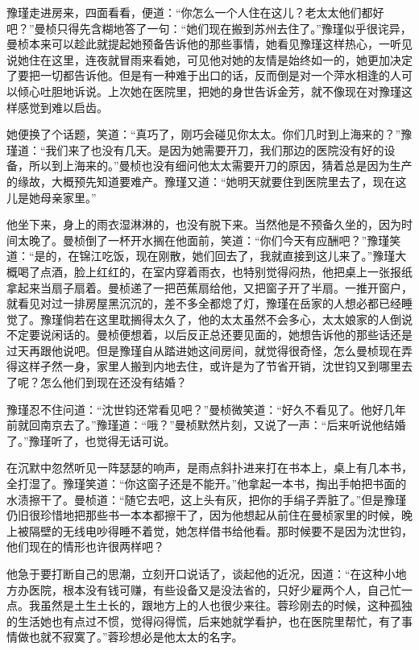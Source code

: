 \par 豫瑾走进房来，四面看看，便道：“你怎么一个人住在这儿？老太太他们都好吧？”曼桢只得先含糊地答了一句：“她们现在搬到苏州去住了。”豫瑾似乎很诧异，曼桢本来可以趁此就提起她预备告诉他的那些事情，她看见豫瑾这样热心，一听见说她住在这里，连夜就冒雨来看她，可见他对她的友情是始终如一的，她更加决定了要把一切都告诉他。但是有一种难于出口的话，反而倒是对一个萍水相逢的人可以倾心吐胆地诉说。上次她在医院里，把她的身世告诉金芳，就不像现在对豫瑾这样感觉到难以启齿。
\par 她便换了个话题，笑道：“真巧了，刚巧会碰见你太太。你们几时到上海来的？”豫瑾道：“我们来了也没有几天。是因为她需要开刀，我们那边的医院没有好的设备，所以到上海来的。”曼桢也没有细问他太太需要开刀的原因，猜着总是因为生产的缘故，大概预先知道要难产。豫瑾又道：“她明天就要住到医院里去了，现在这儿是她母亲家里。”
\par 他坐下来，身上的雨衣湿淋淋的，也没有脱下来。当然他是不预备久坐的，因为时间太晚了。曼桢倒了一杯开水搁在他面前，笑道：“你们今天有应酬吧？”豫瑾笑道：“是的，在锦江吃饭，现在刚散，她们回去了，我就直接到这儿来了。”豫瑾大概喝了点酒，脸上红红的，在室内穿着雨衣，也特别觉得闷热，他把桌上一张报纸拿起来当扇子扇着。曼桢递了一把芭蕉扇给他，又把窗子开了半扇。一推开窗户，就看见对过一排房屋黑沉沉的，差不多全都熄了灯，豫瑾在岳家的人想必都已经睡觉了。豫瑾倘若在这里耽搁得太久了，他的太太虽然不会多心，太太娘家的人倒说不定要说闲话的。曼桢便想着，以后反正总还要见面的，她想告诉他的那些话还是过天再跟他说吧。但是豫瑾自从踏进她这间房间，就觉得很奇怪，怎么曼桢现在弄得这样孑然一身，家里人搬到内地去住，或许是为了节省开销，沈世钧又到哪里去了呢？怎么他们到现在还没有结婚？
\par 豫瑾忍不住问道：“沈世钧还常看见吧？”曼桢微笑道：“好久不看见了。他好几年前就回南京去了。”豫瑾道：“哦？”曼桢默然片刻，又说了一声：“后来听说他结婚了。”豫瑾听了，也觉得无话可说。
\par 在沉默中忽然听见一阵瑟瑟的响声，是雨点斜扑进来打在书本上，桌上有几本书，全打湿了。豫瑾笑道：“你这窗子还是不能开。”他拿起一本书，掏出手帕把书面的水渍擦干了。曼桢道：“随它去吧，这上头有灰，把你的手绢子弄脏了。”但是豫瑾仍旧很珍惜地把那些书一本本都擦干了，因为他想起从前住在曼桢家里的时候，晚上被隔壁的无线电吵得睡不着觉，她怎样借书给他看。那时候要不是因为沈世钧，他们现在的情形也许很两样吧？
\par 他急于要打断自己的思潮，立刻开口说话了，谈起他的近况，因道：“在这种小地方办医院，根本没有钱可赚，有些设备又是没法省的，只好少雇两个人，自己忙一点。我虽然是土生土长的，跟地方上的人也很少来往。蓉珍刚去的时候，这种孤独的生活她也有点过不惯，觉得闷得慌，后来她就学看护，也在医院里帮忙，有了事情做也就不寂寞了。”蓉珍想必是他太太的名字。
